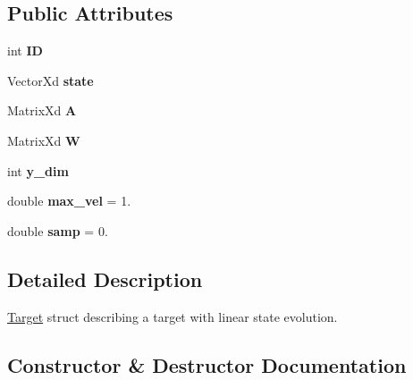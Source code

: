 \subsection*{Public Attributes}
\begin{DoxyCompactItemize}
\item 
\mbox{\label{structnx_1_1Target_a9f14ece231710bdf7610946ee1ad0340}} 
int {\bfseries ID}
\item 
\mbox{\label{structnx_1_1Target_ace67ce1f90bf284b8db8adad8be2ed5e}} 
Vector\+Xd {\bfseries state}
\item 
\mbox{\label{structnx_1_1Target_a42f5bc317ecc3623822bb7c010b87e5a}} 
Matrix\+Xd {\bfseries A}
\item 
\mbox{\label{structnx_1_1Target_a8db57d5dee52aed6f2b0a2a44f034a1b}} 
Matrix\+Xd {\bfseries W}
\item 
\mbox{\label{structnx_1_1Target_af7121dba0afc6e0daa3b33a2db29d75b}} 
int {\bfseries y\+\_\+dim}
\item 
\mbox{\label{structnx_1_1Target_ad0147223864927924694296396478150}} 
double {\bfseries max\+\_\+vel} = 1.
\item 
\mbox{\label{structnx_1_1Target_a9cebb09e697e9927429911b3eaff1dbc}} 
double {\bfseries samp} = 0.
\end{DoxyCompactItemize}


\subsection{Detailed Description}
\hyperlink{structnx_1_1Target}{Target} struct describing a target with linear state evolution. 

\subsection{Constructor \& Destructor Documentation}
\mbox{\label{structnx_1_1Target_aff71c457fa00ebbfd439d351a5574767}} 
